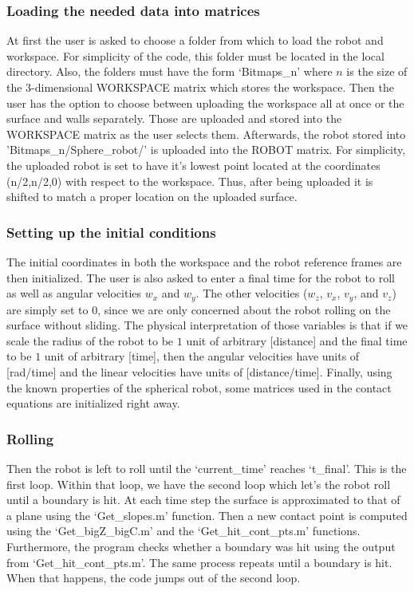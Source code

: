 \documentclass[journal]{IEEEtran}
\begin{document}
\subsubsection{Loading the needed data into matrices}
At first the user is asked to choose a folder from which to load the robot and workspace. For simplicity of the code, this folder must be located in the local directory. Also, the folders must have the form `Bitmaps\_n' where $n$ is the size of the 3-dimensional WORKSPACE matrix which stores the workspace. Then the user has the option to choose between uploading the workspace all at once or the surface and walls separately. Those are uploaded and stored into the WORKSPACE matrix as the user selects them. Afterwards, the robot stored into 'Bitmaps\_n/Sphere\_robot/' is uploaded into the ROBOT matrix. For simplicity, the uploaded robot is set to have it's lowest point located at the coordinates (n/2,n/2,0) with respect to the workspace. Thus, after being uploaded it is shifted to match a proper location on the uploaded surface.
\subsubsection{Setting up the initial conditions}
The initial coordinates in both the workspace and the robot reference frames are then initialized. The user is also asked to enter a final time for the robot to roll as well as angular velocities $w_x$ and $w_y$. The other velocities ($w_z$, $v_x$, $v_y$, and $v_z$) are simply set to $0$, since we are only concerned about the robot rolling on the surface without sliding. The physical interpretation of those variables is that if we scale the radius of the robot to be $1$ unit of arbitrary [distance] and the final time to be $1$ unit of arbitrary [time], then the angular velocities have units of [rad/time] and the linear velocities have units of [distance/time]. Finally, using the known properties of the spherical robot, some matrices used in the contact equations are initialized right away.
\subsubsection{Rolling}
Then the robot is left to roll until the `current\_time' reaches `t\_final'. This is the first loop. Within that loop, we have the second loop which let's the robot roll until a boundary is hit. At each time step the surface is approximated to that of a plane using the `Get\_slopes.m' function. Then a new contact point is computed using the `Get\_bigZ\_bigC.m' and the `Get\_hit\_cont\_pts.m' functions. Furthermore, the program checks whether a boundary was hit using the output from `Get\_hit\_cont\_pts.m'. The same process repeats until a boundary is hit. When that happens, the code jumps out of the second loop.
\end{document}
